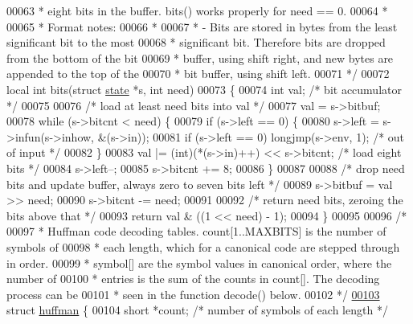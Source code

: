 \begin{DoxyCode}
00063 \textcolor{comment}{ * eight bits in the buffer.  bits() works properly for need == 0.}
00064 \textcolor{comment}{ *}
00065 \textcolor{comment}{ * Format notes:}
00066 \textcolor{comment}{ *}
00067 \textcolor{comment}{ * - Bits are stored in bytes from the least significant bit to the most}
00068 \textcolor{comment}{ *   significant bit.  Therefore bits are dropped from the bottom of the bit}
00069 \textcolor{comment}{ *   buffer, using shift right, and new bytes are appended to the top of the}
00070 \textcolor{comment}{ *   bit buffer, using shift left.}
00071 \textcolor{comment}{ */}
00072 local \textcolor{keywordtype}{int} bits(\textcolor{keyword}{struct} \hyperlink{structstate}{state} *s, \textcolor{keywordtype}{int} need)
00073 \{
00074     \textcolor{keywordtype}{int} val;            \textcolor{comment}{/* bit accumulator */}
00075 
00076     \textcolor{comment}{/* load at least need bits into val */}
00077     val = s->bitbuf;
00078     \textcolor{keywordflow}{while} (s->bitcnt < need) \{
00079         \textcolor{keywordflow}{if} (s->left == 0) \{
00080             s->left = s->infun(s->inhow, &(s->in));
00081             \textcolor{keywordflow}{if} (s->left == 0) longjmp(s->env, 1);       \textcolor{comment}{/* out of input */}
00082         \}
00083         val |= (int)(*(s->in)++) << s->bitcnt;          \textcolor{comment}{/* load eight bits */}
00084         s->left--;
00085         s->bitcnt += 8;
00086     \}
00087 
00088     \textcolor{comment}{/* drop need bits and update buffer, always zero to seven bits left */}
00089     s->bitbuf = val >> need;
00090     s->bitcnt -= need;
00091 
00092     \textcolor{comment}{/* return need bits, zeroing the bits above that */}
00093     \textcolor{keywordflow}{return} val & ((1 << need) - 1);
00094 \}
00095 
00096 \textcolor{comment}{/*}
00097 \textcolor{comment}{ * Huffman code decoding tables.  count[1..MAXBITS] is the number of symbols of}
00098 \textcolor{comment}{ * each length, which for a canonical code are stepped through in order.}
00099 \textcolor{comment}{ * symbol[] are the symbol values in canonical order, where the number of}
00100 \textcolor{comment}{ * entries is the sum of the counts in count[].  The decoding process can be}
00101 \textcolor{comment}{ * seen in the function decode() below.}
00102 \textcolor{comment}{ */}
\hyperlink{structhuffman}{00103} \textcolor{keyword}{struct }\hyperlink{structhuffman}{huffman} \{
00104     \textcolor{keywordtype}{short} *count;       \textcolor{comment}{/* number of symbols of each length */}

\end{DoxyCode}
